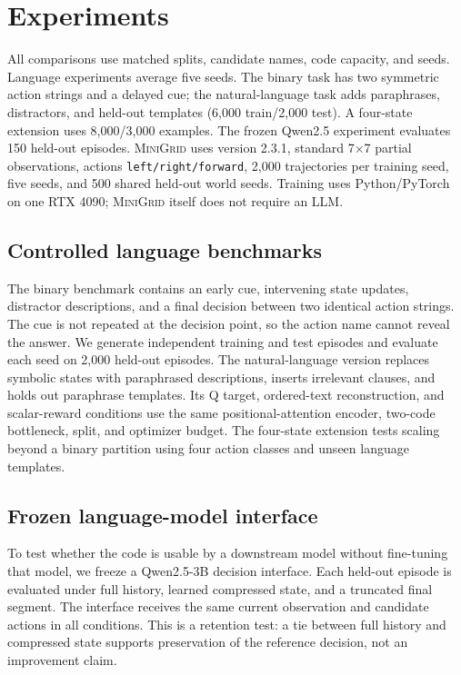 \documentclass{article}
\def\minigrid{\textsc{MiniGrid}}
\def\qwen{Qwen2.5}
\begin{document}
\section{Experiments}
All comparisons use matched splits, candidate names, code capacity, and seeds. Language experiments average five seeds. The binary task has two symmetric action strings and a delayed cue; the natural-language task adds paraphrases, distractors, and held-out templates (6,000 train/2,000 test). A four-state extension uses 8,000/3,000 examples. The frozen \qwen{} experiment evaluates 150 held-out episodes. \minigrid{} uses version 2.3.1, standard 7$\times$7 partial observations, actions \texttt{left/right/forward}, 2,000 trajectories per training seed, five seeds, and 500 shared held-out world seeds. Training uses Python/PyTorch on one RTX 4090; \minigrid{} itself does not require an LLM.

\subsection{Controlled language benchmarks}
The binary benchmark contains an early cue, intervening state updates, distractor descriptions, and a final decision between two identical action strings. The cue is not repeated at the decision point, so the action name cannot reveal the answer. We generate independent training and test episodes and evaluate each seed on 2,000 held-out episodes. The natural-language version replaces symbolic states with paraphrased descriptions, inserts irrelevant clauses, and holds out paraphrase templates. Its Q target, ordered-text reconstruction, and scalar-reward conditions use the same positional-attention encoder, two-code bottleneck, split, and optimizer budget. The four-state extension tests scaling beyond a binary partition using four action classes and unseen language templates.

\subsection{Frozen language-model interface}
To test whether the code is usable by a downstream model without fine-tuning that model, we freeze a \qwen-3B decision interface. Each held-out episode is evaluated under full history, learned compressed state, and a truncated final segment. The interface receives the same current observation and candidate actions in all conditions. This is a retention test: a tie between full history and compressed state supports preservation of the reference decision, not an improvement claim.
\end{document}
